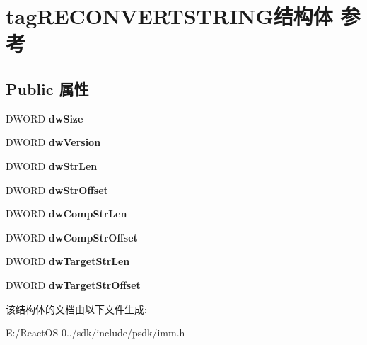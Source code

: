 \hypertarget{structtag_r_e_c_o_n_v_e_r_t_s_t_r_i_n_g}{}\section{tag\+R\+E\+C\+O\+N\+V\+E\+R\+T\+S\+T\+R\+I\+N\+G结构体 参考}
\label{structtag_r_e_c_o_n_v_e_r_t_s_t_r_i_n_g}
\subsection*{Public 属性}
\begin{DoxyCompactItemize}
\item 
\mbox{\label{structtag_r_e_c_o_n_v_e_r_t_s_t_r_i_n_g_a7bce43fbf8da74b13fb29fad53d28a33}} 
D\+W\+O\+RD {\bfseries dw\+Size}
\item 
\mbox{\label{structtag_r_e_c_o_n_v_e_r_t_s_t_r_i_n_g_acbc35247f671d219ab617f7f1d76416e}} 
D\+W\+O\+RD {\bfseries dw\+Version}
\item 
\mbox{\label{structtag_r_e_c_o_n_v_e_r_t_s_t_r_i_n_g_a0b5973aaabfd84a6aa55f0bbfd2eddbe}} 
D\+W\+O\+RD {\bfseries dw\+Str\+Len}
\item 
\mbox{\label{structtag_r_e_c_o_n_v_e_r_t_s_t_r_i_n_g_ab42b170993b5f9a5c895a4ccd98f2d1e}} 
D\+W\+O\+RD {\bfseries dw\+Str\+Offset}
\item 
\mbox{\label{structtag_r_e_c_o_n_v_e_r_t_s_t_r_i_n_g_a3f1e5280378f7234d75cd92350120c85}} 
D\+W\+O\+RD {\bfseries dw\+Comp\+Str\+Len}
\item 
\mbox{\label{structtag_r_e_c_o_n_v_e_r_t_s_t_r_i_n_g_ab08c68f24bd5f5178d80a18c18ee8041}} 
D\+W\+O\+RD {\bfseries dw\+Comp\+Str\+Offset}
\item 
\mbox{\label{structtag_r_e_c_o_n_v_e_r_t_s_t_r_i_n_g_aa8faa6483bc4c110a84ca92845358984}} 
D\+W\+O\+RD {\bfseries dw\+Target\+Str\+Len}
\item 
\mbox{\label{structtag_r_e_c_o_n_v_e_r_t_s_t_r_i_n_g_a117c4b9ceeb4af6b49495246b20f2881}} 
D\+W\+O\+RD {\bfseries dw\+Target\+Str\+Offset}
\end{DoxyCompactItemize}


该结构体的文档由以下文件生成\+:\begin{DoxyCompactItemize}
\item 
E\+:/\+React\+O\+S-\/0../sdk/include/psdk/imm.\+h\end{DoxyCompactItemize}
